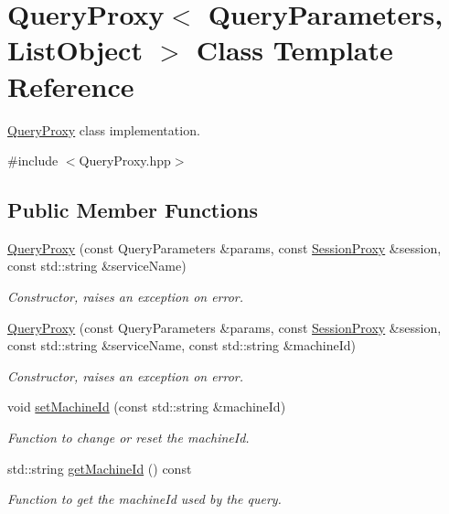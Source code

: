 \hypertarget{classQueryProxy}{
\section{QueryProxy$<$ QueryParameters, ListObject $>$ Class Template Reference}
\label{classQueryProxy}
}


\hyperlink{classQueryProxy}{QueryProxy} class implementation.  




{\ttfamily \#include $<$QueryProxy.hpp$>$}

\subsection*{Public Member Functions}
\begin{DoxyCompactItemize}
\item 
\hyperlink{classQueryProxy_ad6fa4a9f170c815854162c1e3b3b53f3}{QueryProxy} (const QueryParameters \&params, const \hyperlink{classSessionProxy}{SessionProxy} \&session, const std::string \&serviceName)
\begin{DoxyCompactList}\small\item\em Constructor, raises an exception on error. \item\end{DoxyCompactList}\item 
\hyperlink{classQueryProxy_ae92822516e13ef06702b563fd7b3b6e8}{QueryProxy} (const QueryParameters \&params, const \hyperlink{classSessionProxy}{SessionProxy} \&session, const std::string \&serviceName, const std::string \&machineId)
\begin{DoxyCompactList}\small\item\em Constructor, raises an exception on error. \item\end{DoxyCompactList}\item 
void \hyperlink{classQueryProxy_a78d4f01c14cf9970055099613efa29c6}{setMachineId} (const std::string \&machineId)
\begin{DoxyCompactList}\small\item\em Function to change or reset the machineId. \item\end{DoxyCompactList}\item 
std::string \hyperlink{classQueryProxy_ab4f8c0a551ae3ed4d4fa966c864cf648}{getMachineId} () const 
\begin{DoxyCompactList}\small\item\em Function to get the machineId used by the query. \item\end{DoxyCompactList}\item 

\end{DoxyCompactItemize}
